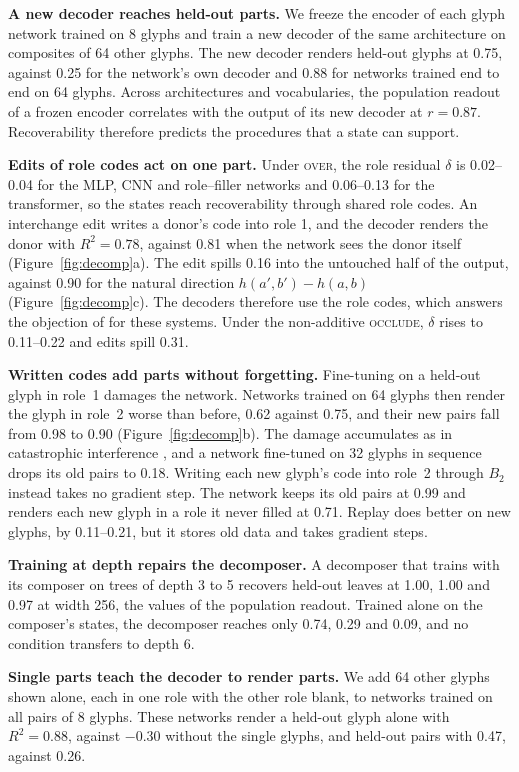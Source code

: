 \documentclass[10pt]{article}
\theoremstyle{plain}
\theoremstyle{remark}
\begin{document}
\textbf{A new decoder reaches held-out parts.} We freeze the encoder of each glyph network trained on 8 glyphs and train a new decoder of the same architecture on composites of 64 other glyphs. The new decoder renders held-out glyphs at 0.75, against 0.25 for the network's own decoder and 0.88 for networks trained end to end on 64 glyphs. Across architectures and vocabularies, the population readout of a frozen encoder correlates with the output of its new decoder at $r = 0.87$. Recoverability therefore predicts the procedures that a state can support.

\textbf{Edits of role codes act on one part.} Under \textsc{over}, the role residual $\delta$ is 0.02--0.04 for the MLP, CNN and role--filler networks and 0.06--0.13 for the transformer, so the states reach recoverability through shared role codes. An interchange edit writes a donor's code into role 1, and the decoder renders the donor with $R^2 = 0.78$, against 0.81 when the network sees the donor itself (Figure~\ref{fig:decomp}a). The edit spills 0.16 into the untouched half of the output, against 0.90 for the natural direction $h(a', b') - h(a, b)$ (Figure~\ref{fig:decomp}c). The decoders therefore use the role codes, which answers the objection of \citet{fodor1990} for these systems. Under the non-additive \textsc{occlude}, $\delta$ rises to 0.11--0.22 and edits spill 0.31.

\textbf{Written codes add parts without forgetting.} Fine-tuning on a held-out glyph in role~1 damages the network. Networks trained on 64 glyphs then render the glyph in role~2 worse than before, 0.62 against 0.75, and their new pairs fall from 0.98 to 0.90 (Figure~\ref{fig:decomp}b). The damage accumulates as in catastrophic interference \citep{mccloskey1989}, and a network fine-tuned on 32 glyphs in sequence drops its old pairs to 0.18. Writing each new glyph's code into role~2 through $B_2$ instead takes no gradient step. The network keeps its old pairs at 0.99 and renders each new glyph in a role it never filled at 0.71. Replay does better on new glyphs, by 0.11--0.21, but it stores old data and takes gradient steps.

\textbf{Training at depth repairs the decomposer.} A decomposer that trains with its composer on trees of depth 3 to 5 recovers held-out leaves at 1.00, 1.00 and 0.97 at width 256, the values of the population readout. Trained alone on the composer's states, the decomposer reaches only 0.74, 0.29 and 0.09, and no condition transfers to depth 6.

\textbf{Single parts teach the decoder to render parts.} We add 64 other glyphs shown alone, each in one role with the other role blank, to networks trained on all pairs of 8 glyphs. These networks render a held-out glyph alone with $R^2 = 0.88$, against $-0.30$ without the single glyphs, and held-out pairs with 0.47, against 0.26.
\end{document}
